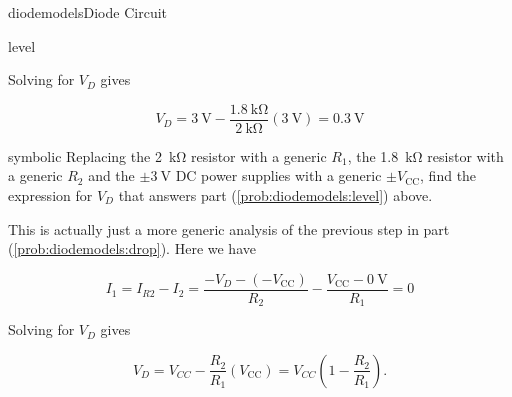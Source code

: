 \begin{mainquestion}{diodemodels}{Diode Circuit}
\begin{partquestion}{level}
\begin{answer}
Solving for $V_D$ gives

\[
V_D
=
\qty{3}{\volt}
-
\frac{\qty{1.8}{\kilo\ohm}}{\qty{2}{\kilo\ohm}}
\left(\qty{3}{\volt}\right)
=
\qty{0.3}{\volt}
\]
\end{answer}
\end{partquestion}

\begin{partquestion}{symbolic}
{Replacing the \qty{2}{\kilo\ohm} resistor with a generic $R_1$, the \qty{1.8}{\kilo\ohm} resistor with a generic $R_2$ and the $\pm\qty{3}{\volt}$ DC power supplies with a generic $\pm V_{\text{CC}}$, find the expression for $V_D$ that answers part (\cref{prob:diodemodels:level}) above.}
\begin{answer}
This is actually just a more generic analysis of the previous step in part (\cref{prob:diodemodels:drop}). Here we have

\[
I_1
=
I_{R2}
-
I_2
=
\frac{-V_D-(-V_{\text{CC}})}{R_2}
-
\frac{V_{\text{CC}}-\qty{0}{\volt}}{R_1}
=
0
\]

Solving for $V_D$ gives

\[
V_D
=
V_{CC}
-
\frac{R_2}{R_1}\left(V_{\text{CC}}\right)
=
V_{CC}\left(1-\frac{R_2}{R_1}\right).
\]
\end{answer}
\end{partquestion}

\end{mainquestion}